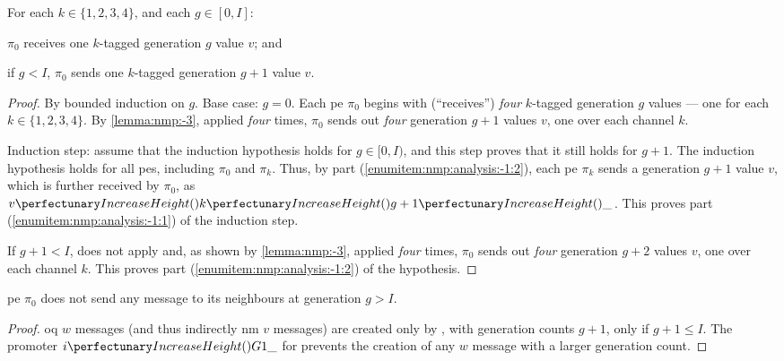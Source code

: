 \begin{theorem}\label{theorem:nmp:-1}
    For each $k \in \{ 1, 2, 3, 4 \}$, and each $g \in [0, I]$:
    \begin{inparaenum}[(i)]
        \item\label{enumitem:nmp:analysis:-1:1} $\pi_0$ receives one $k$-tagged generation $g$ value $v$; and
        \item\label{enumitem:nmp:analysis:-1:2} if $g < I$, $\pi_0$ sends one $k$-tagged generation $g+1$ value $v$.
    \end{inparaenum}
\end{theorem}

\begin{proof}
By bounded induction on $g$. Base case: $g = 0$. Each \gls{pe} $\pi_0$ begins with (``receives'') \emph{four} $k$-tagged generation $g$ values --- one for each $k \in \{ 1, 2, 3, 4 \}$. By \cref{lemma:nmp:-3}, applied \emph{four} times, $\pi_0$ sends out \emph{four} generation $g+1$ values $v$, one over each channel $k$.

Induction step: assume that the induction hypothesis holds for 
$g \in [0, I)$, and this step proves that it still holds for $g+1$.
The induction hypothesis holds for all \glspl{pe}, 
including $\pi_0$ and $\pi_k$. 
Thus, by part (\ref{enumitem:nmp:analysis:-1:2}), each \gls{pe} $\pi_k$ sends a generation $g+1$ value $v$, 
which is further received by $\pi_0$, as $\cpvv{k}{g+1}{\cpdiscard}$.
This proves part (\ref{enumitem:nmp:analysis:-1:1}) of the induction step.

If $g+1 < I$,  does not apply and, 
as shown by \cref{lemma:nmp:-3}, applied \emph{four} times, 
$\pi_0$ sends out \emph{four} generation $g+2$ values $v$, one over each channel $k$.
This proves part (\ref{enumitem:nmp:analysis:-1:2}) of the hypothesis.
\end{proof}

\begin{theorem}\label{theorem:nmp:-2}
    \Gls{pe} \(\pi_0\) does not send any message to its neighbours at generation \(g > I\).
\end{theorem}

\begin{proof}
    \Gls{oq} \(w\) messages (and thus indirectly \gls{nm} \(v\) messages) are created only by , with generation counts \(g + 1\), only if \(g + 1 \leq I\).  The \gls{promoter} \(\cpfunc{i}{G1\cpdiscard}\) for  prevents the creation of any \(w\) message with a larger generation count.
\end{proof}

